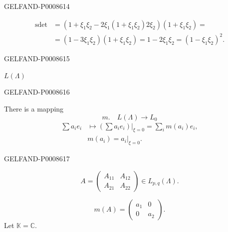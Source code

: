 \begin{GelfandAdjacentEvidence}{GELFAND-P000861}{4}

\[
\begin{aligned}
\operatorname{sdet}
 &=(1+\xi_1\xi_2-2\xi_1(1+\xi_1\xi_2)2\xi_2)(1+\xi_1\xi_2)=\\
 &=(1-3\xi_1\xi_2)(1+\xi_1\xi_2)=1-2\xi_1\xi_2=(1-\xi_1\xi_2)^2.
\end{aligned}
\]
\end{GelfandAdjacentEvidence}
\begin{GelfandAdjacentEvidence}{GELFAND-P000861}{5}



\(L(\Lambda)\)
\end{GelfandAdjacentEvidence}
\begin{GelfandAdjacentEvidence}{GELFAND-P000861}{6}


There is a mapping
\[
m.\quad L(\Lambda)\longrightarrow L_0
\]
\[
\begin{aligned}
\sum a_i e_i
&\longmapsto\left.\left(\sum a_i e_i\right)\right|_{\xi=0}
=\sum_i m(a_i)e_i,\\
&m(a_i)=\left.a_i\right|_{\xi=0}.
\end{aligned}
\]
\end{GelfandAdjacentEvidence}
\begin{GelfandAdjacentEvidence}{GELFAND-P000861}{7}

\[
A=\begin{pmatrix}A_{11}&A_{12}\\A_{21}&A_{22}\end{pmatrix}\in L_{p,q}(\Lambda).
\]
\end{GelfandAdjacentEvidence}

\[
m(A)=\begin{pmatrix}a_1&0\\0&a_2\end{pmatrix}.\tag{9}
\]
Let \(\mathbb K=\mathbb C\).

